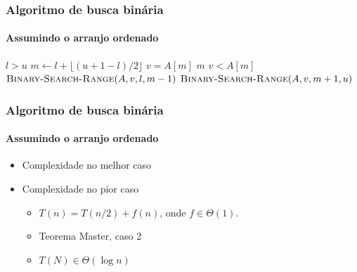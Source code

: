 \documentclass{beamer}
\begin{document}
\begin{frame}
  \frametitle{Algoritmo de busca binária}
  \framesubtitle{Assumindo o arranjo ordenado}
\begin{small}
\begin{codebox}
\zi \Comment {}
\li \If $l > u$
\li \Then
      \Return {}
\li \Else
\li   $m \gets l + \lfloor (u + 1 - l)/2 \rfloor$
\li   \If $v = A[m]$
\li   \Then \Return $m$
\li   \ElseIf $v < A[m]$
\li   \Then \Return $\textnormal{\scshape Binary-Search-Range}(A, v, l, m-1)$
\li   \ElseNoIf
\li \Return $\textnormal{\scshape Binary-Search-Range}(A, v, m+1, u)$
      \End
    \End
\zi \Comment {}
\end{codebox}  
\end{small}
\end{frame}

\begin{frame}
  \frametitle{Algoritmo de busca binária}
  \framesubtitle{Assumindo o arranjo ordenado}

\begin{itemize}

  \item Complexidade no melhor caso

  \item Complexidade no pior caso

    \begin{itemize}

    \item $T(n) = T(n/2) + f(n)$, onde $f \in \Theta(1)$.

    \item Teorema Master, caso 2

    \item $T(N) \in \Theta(\log n)$

    \end{itemize}

\end{itemize}

\end{frame}
\end{document}
